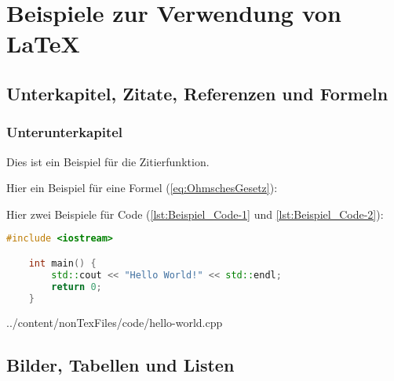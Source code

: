 


\chapter{Beispiele zur Verwendung von LaTeX}
   
\section{Unterkapitel, Zitate, Referenzen und Formeln}
\label{sec:Unterkapitel}

\subsection{Unterunterkapitel}

Dies ist ein Beispiel für die Zitierfunktion. \cite[Vgl.][S. 1 ff.]{Mustermann2023} 


\vspace{0.5cm}
Hier ein Beispiel für eine Formel (\ref{eq:OhmschesGesetz}):

\vspace{0.5cm}
Hier zwei Beispiele für Code (\ref{lst:Beispiel_Code-1} und \ref{lst:Beispiel_Code-2}):

\begin{lstlisting}[language=C++, caption={Beispiel: direktes einfügen von Code}, label={lst:Beispiel_Code-1}]
    #include <iostream>

    int main() {
        std::cout << "Hello World!" << std::endl;
        return 0;
    }
\end{lstlisting}


{../content/nonTexFiles/code/hello-world.cpp}


\newpage
\section{Bilder, Tabellen und Listen}


